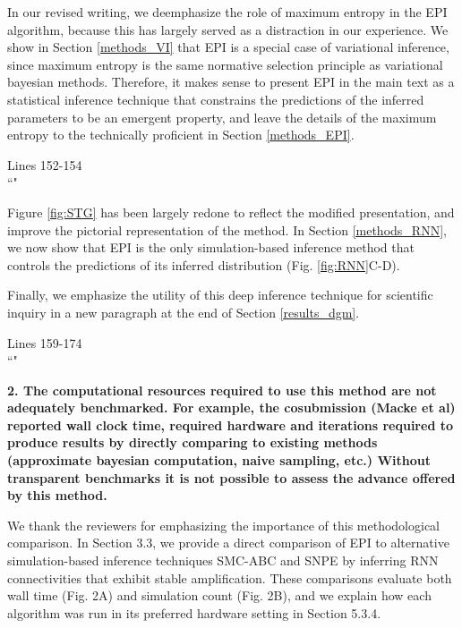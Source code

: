 \documentclass[11pt,a4paper]{article}
\begin{document}
In our revised writing, we deemphasize the role of maximum entropy in the EPI algorithm, because this has largely served as a distraction in our experience.
We show in Section \ref{methods_VI} that EPI is a special case of variational inference, since maximum entropy is the same normative selection principle as variational bayesian methods.  
Therefore, it makes sense to present EPI in the main text as a statistical inference technique that constrains the predictions of the inferred parameters to be an emergent property, and leave the details of the maximum entropy to the technically proficient in Section \ref{methods_EPI}.

\begin{displayquote}
Lines 152-154\\
``"
\end{displayquote}

Figure \ref{fig:STG} has been largely redone to reflect the modified presentation, and improve the pictorial representation of the method.
In Section \ref{methods_RNN}, we now show that EPI is the only simulation-based inference method that controls the predictions of its inferred distribution (Fig. \ref{fig:RNN}C-D).

Finally, we emphasize the utility of this deep inference technique for scientific inquiry in a new paragraph at the end of Section \ref{results_dgm}.

\begin{displayquote}
Lines 159-174\\
``"
\end{displayquote}

\textbf{2. The computational resources required to use this method are not adequately benchmarked. For example, the cosubmission (Macke et al) reported wall clock time, required hardware and iterations required to produce results by directly comparing to existing methods (approximate bayesian computation, naive sampling, etc.) Without transparent benchmarks it is not possible to assess the advance offered by this method.} 

We thank the reviewers for emphasizing the importance of this methodological comparison.  In Section 3.3, we provide a direct comparison of EPI to alternative simulation-based inference techniques SMC-ABC and SNPE by inferring RNN connectivities that exhibit stable amplification.  These comparisons evaluate both wall time (Fig. 2A) and simulation count (Fig. 2B), and we explain how each algorithm was run in its preferred hardware setting in Section 5.3.4.
 
\end{document}
